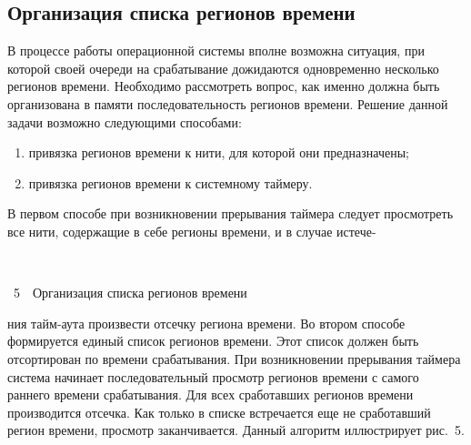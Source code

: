 \begin{multicols}{2}
\section{Организация списка регионов времени} %

   В процессе работы операционной системы вполне возможна ситуация, при которой своей
очереди на срабатывание дожидаются одновременно несколько регионов времени. Необходимо
рас\-смот\-реть вопрос, как именно должна быть организована в памяти последовательность регионов
времени. Решение данной задачи возможно следующими способами:
   \begin{enumerate}[(1)]
\item привязка регионов времени к нити, для которой они предназначены;
\item привязка регионов времени к системному таймеру.
\end{enumerate}

   В первом способе при возникновении прерывания таймера следует просмотреть все нити,
содержащие в себе регионы времени, и в случае истече-\linebreak\vspace*{-12pt}
\pagebreak
\vspace*{6pt}
\begin{center}
\mbox{%
\epsfxsize=42.832mm
}
\end{center}
\vspace*{1pt}
{{\figurename~5}\ \ \small{Организация списка регионов времени}}
\bigskip
\addtocounter{figure}{1}  


\noindent
ния тайм-аута произвести отсечку региона
времени. Во втором способе формируется единый список регионов времени. Этот список должен
быть отсортирован по времени срабатывания. При возникновении прерывания таймера система
начинает последовательный просмотр регионов времени с самого раннего времени срабатывания.
Для всех сработавших регионов времени производится отсечка. Как только в списке встречается
еще не сработавший регион времени, просмотр заканчивается. Данный алгоритм иллюстрирует
рис.~5.

\begin{figure*} %
\vspace*{1pt}
\begin{center}
\mbox{%
\epsfxsize=151.582mm
}
\end{center}
\vspace*{-9pt}
   \vspace*{4pt}
   \end{figure*}
   

\end{multicols}
